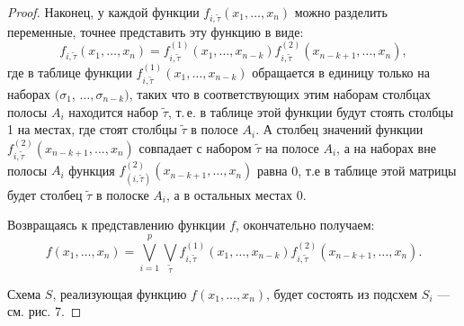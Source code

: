 \begin{proof}
    Наконец, у каждой функции $f_{i,\widetilde{\tau}}(x_1, \ldots, x_n)$ можно разделить переменные, точнее представить эту функцию в виде:
    \[
        f_{i, \widetilde{\tau}}(x_1,\ldots,x_n) = f^{(1)}_{i, \widetilde{\tau}}(x_1, \ldots, x_{n-k})f^{(2)}_{i, \widetilde{\tau}}(x_{n-k+1}, \ldots, x_{n}),
    \]
    где в таблице функции $f^{(1)}_{i, \widetilde{\tau}}(x_1, \ldots, x_{n-k})$ обращается в единицу только на наборах $(\sigma_1$, $\ldots, \sigma_{n-k})$, таких что в соответствующих этим наборам столбцах полосы $A_i$ находится набор $\widetilde{\tau}$, т.\,е. в таблице этой функции будут стоять столбцы 1 на местах, где стоят столбцы $\widetilde{\tau}$ в полосе $A_i$. А столбец значений функции $f^{(2)}_{i,\widetilde{\tau}}(x_{n-k+1}, \ldots, x_n)$ совпадает с набором $\widetilde{\tau}$ на полосе $A_i$, а на наборах вне полосы $A_i$ функция $f^{(2)}_{(i,\widetilde{\tau})}(x_{n-k+1}, \ldots, x_n)$ равна 0, т.е в таблице этой матрицы будет столбец $\widetilde{\tau}$ в полоске $A_i$, а в остальных местах $0$.

    Возвращаясь к представлению функции $f$, окончательно получаем:
    \[
         f(x_1, \ldots, x_n) = \bigvee_{i=1}^p \bigvee_{\widetilde{\tau}} f^{(1)}_{i, \widetilde{\tau}}(x_1, \ldots, x_{n-k})f^{(2)}_{i, \widetilde{\tau}}(x_{n-k+1}, \ldots, x_{n}).
    \]
    
    Схема $S$, реализующая функцию $f(x_1, \ldots, x_n)$, будет состоять из подсхем $S_i$ --- см. рис. 7.


\end{proof}
